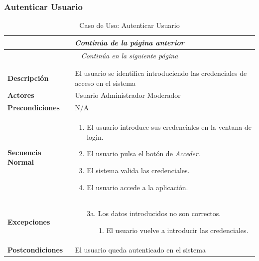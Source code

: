 \subsubsection*{Autenticar Usuario}
\begin{longtable}{| p{4cm} | p{10cm} |}
\endfirsthead
\multicolumn{2}{c}{\textit{Continúa de la página anterior}}\\[12pt]
\hline
\endhead
\hline
\multicolumn{2}{c}{\textit{Continúa en la siguiente página}} \\
\endfoot
\hline
\caption{Caso de Uso: Autenticar Usuario}\label{fig:1}\\
\endlastfoot


\hline
\multicolumn{2}{|c|}{\textbf{CU$<$01$>$ Autenticar Usuario}} \\

\hline
\textbf{Descripción} &
El usuario se identifica introduciendo las credenciales de acceso en el sistema \\

\hline
\textbf{Actores} &
Usuario\newline
Administrador\newline
Moderador\\

\hline
\textbf{Precondiciones} &
N/A\\

\hline
\textbf{Secuencia Normal} &\mbox{}\par\vspace{-\baselineskip}
\begin{enumerate}[leftmargin=0.7cm, topsep=0.1cm]
\item El usuario introduce sus credenciales en la ventana de login. 
\item El usuario pulsa el botón de \textit{Acceder}.
\item El sistema valida las credenciales.
\item El usuario accede a la aplicación.
\end{enumerate}\\

\hline
\textbf{Excepciones} &\mbox{}\par\vspace{-\baselineskip}
\begin{enumerate}[leftmargin=0.9cm, topsep=0.1cm]
\item[3a.] Los datos introducidos no son correctos.
	\begin{itemize}
	\item[1.] El usuario vuelve a introducir las credenciales.
	\end{itemize}

\end{enumerate}\\

\hline
\textbf{Postcondiciones} & 
El usuario queda autenticado en el sistema\\
\hline
\end{longtable}




